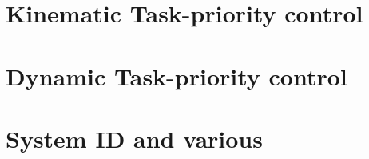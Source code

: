 \documentclass{ntnuthesis}
\begin{document}




\part{Kinematic Task-priority control}




\part{Dynamic Task-priority control}








\part{System ID and various}

\end{document}
